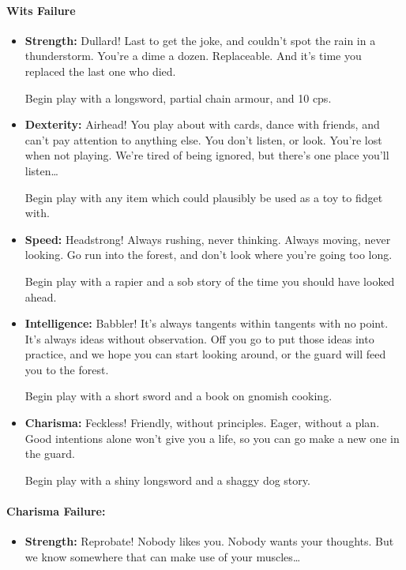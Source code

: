 \begin{multicols}{2}
\paragraph{Wits Failure}
\begin{itemize}

  \item
  \textbf{Strength:}
  Dullard!
  Last to get the joke, and couldn't spot the rain in a thunderstorm.
  You're a dime a dozen.
  Replaceable.
  And it's time you replaced the last one who died.

  Begin play with a longsword, partial chain armour, and 10 \glspl{cp}.
  \item
  \textbf{Dexterity:}
  Airhead!
  You play about with cards, dance with friends, and can't pay attention to anything else.
  You don't listen, or look.
  You're lost when not playing.
  We're tired of being ignored, but there's one place you'll listen\ldots

  Begin play with any item which could plausibly be used as a toy to fidget with.
  \item
  \textbf{Speed:}
  Headstrong!
  Always rushing, never thinking.
  Always moving, never looking.
  Go run into the forest, and don't look where you're going too long.

  Begin play with a rapier and a sob story of the time you should have looked ahead.
  \item
  \textbf{Intelligence:}
  Babbler!
  It's always tangents within tangents with no point.
  It's always ideas without observation.
  Off you go to put those ideas into practice, and we hope you can start looking around, or the \gls{guard} will feed you to the forest.

  Begin play with a short sword and a book on gnomish cooking.
  \item
  \textbf{Charisma:}
  Feckless!
  Friendly, without principles.
  Eager, without a plan.
  Good intentions alone won't give you a life, so you can go make a new one in the \gls{guard}.

  Begin play with a shiny longsword and a shaggy dog story.
\end{itemize}

\paragraph{Charisma Failure:}

\begin{itemize}

  \item
  \textbf{Strength:}
  Reprobate!
  Nobody likes you.
  Nobody wants your thoughts.
  But we know somewhere that can make use of your muscles\ldots


\end{itemize}
\end{multicols}
